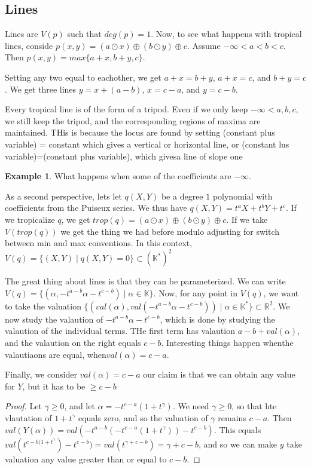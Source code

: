 \documentclass[11pt]{article}
\theoremstyle{definition}
\newtheorem{protoexample}{Example}[section]
\newenvironment{ex}
   {\begin{protoexample}}
   {\end{protoexample}}
\def\RR{{\mathbb R}}
\def\KK{{\mathbb K}}
\begin{document}
\subsection{Lines}
Lines are $V(p)$ such that $deg(p)=1$.
Now, to see what happens with tropical lines, conside $p(x,y) = (a \odot x) \oplus (b \odot y) \oplus c$. Assume $-\infty<a<b<c$. Then $p(x,y) = max\{ a+x,b+y,c\}$.

Setting any two equal to eachother, we get $a+x=b+y$, $a+x=c$, and $b+y=c$. We get three lines $y=x+(a-b)$, $x=c-a$, and $y=c-b$.

Every tropical line is of the form of a tripod. Even if we only keep $-\infty< a,b,c$, we still keep the tripod, and the corresponding regions of maxima are maintained. THis is because the locus are found by setting (constant plus variable) = constant which gives a vertical or horizontal line, or (constant lus variable)=(constant plus variable), which givesa  line of slope one


\begin{ex}
    What happens when some of the coefficients are $-\infty$.
\end{ex}



As a second perspective, lets let $q(X,Y)$ be a degree $1$ polynomial with coefficients from the Puiseux  series. We thus have $q(X,Y)=t^aX+t^bY+t^c$. If we tropicalize $q$, we get $trop(q)=(a \odot x) \oplus (b \odot y) \oplus c$. If we take $V(trop (q))$ we get the thing we had before modulo adjusting for switch between min and max conventions. In this context, $V(q) = \{(X,Y)\; |\; q(X,Y)=0\} \subset (\KK^*)^2$


The great thing about lines is that they can be parameterized. We can write $V(q)= \{(\alpha, -t^{a-b}\alpha -t^{c-b})\; |\; \alpha \in \KK\}$. Now, for any point in $V(q)$, we want to take the valuation $\{(val(\alpha),val( -t^{a-b}\alpha -t^{c-b}))\; |\; \alpha \in \KK^*\} \subset \RR^2$. We now study the valaution of $-t^{a-b}\alpha -t^{c-b}$, which is done by studying the valaution of the individual terms. THe first term has valaution $a-b + val(\alpha)$, and the valaution on the right equals $c-b$. Interesting things happen whenthe valautiaons are equal, when$ val(\alpha)= c-a$.


Finally, we consider $val(\alpha) = c-a$ our claim is that we can obtain any value for $Y$, but it has to be $\geq c-b$

\begin{proof}
    Let $\gamma \geq 0$, and let $\alpha =-t^{c-a}(1+t^\gamma)$. We need $\gamma \geq 0$, so that hte vlautation of $1+t^{\gamma}$ equals zero, and so the valuation of $\gamma$ remains $c-a$. Then $val(Y(\alpha)) =val(-t^{a-b}(-t^{c-a}(1+t^\gamma)) - t^{c-b} )$. This equals $val(t^{c-b(1+t^\gamma}) -t^{c-b}) = val(t^{\gamma +c-b}) = \gamma+c-b$, and so we can make $y$ take valuation any value greater than or equal to $c-b$.
\end{proof}
\end{document}

